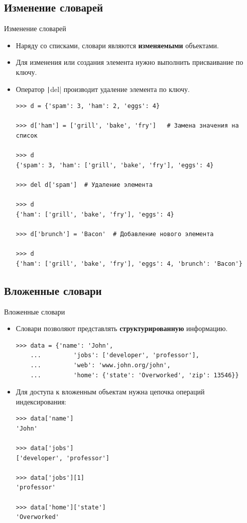\documentclass[aspectratio=169, mathserif]{beamer}%
\begin{document}
\subsection{Изменение словарей}
\scriptsize
\begin{frame}[fragile]{Изменение словарей}
\begin{itemize}
\item Наряду со списками, словари являются \textcolor{extraorange}{\textbf{изменяемыми}} объектами.
\item  Для изменения или создания элемента нужно выполнить присваивание по ключу. 
\item Оператор \texttt|del| производит удаление элемента по ключу.

\begin{verbatim}
>>> d = {'spam': 3, 'ham': 2, 'eggs': 4}

>>> d['ham'] = ['grill', 'bake', 'fry']   # Замена значения на список

>>> d
{'spam': 3, 'ham': ['grill', 'bake', 'fry'], 'eggs': 4}

>>> del d['spam']  # Удаление элемента

>>> d
{'ham': ['grill', 'bake', 'fry'], 'eggs': 4}

>>> d['brunch'] = 'Bacon'  # Добавление нового элемента

>>> d
{'ham': ['grill', 'bake', 'fry'], 'eggs': 4, 'brunch': 'Bacon'}
\end{verbatim}
\end{itemize}
\vfill
\end{frame}

\subsection{Вложенные словари}

\begin{frame}[fragile]{Вложенные словари}
\scriptsize
\begin{itemize}
\item Словари позволяют представлять \textcolor{extraorange}{\textbf{структурированную}} информацию.

\begin{verbatim}
>>> data = {'name': 'John',
	...         'jobs': ['developer', 'professor'],
	...         'web': 'www.john.org/john',
	...         'home': {'state': 'Overworked', 'zip': 13546}}
\end{verbatim}
\item Для доступа к вложенным объектам нужна цепочка операций индексирования:

\begin{verbatim}
>>> data['name']
'John'

>>> data['jobs']
['developer', 'professor']

>>> data['jobs'][1]
'professor'

>>> data['home']['state']
'Overworked'
\end{verbatim}
\end{itemize}
\vfill
\end{frame}
\end{document}
